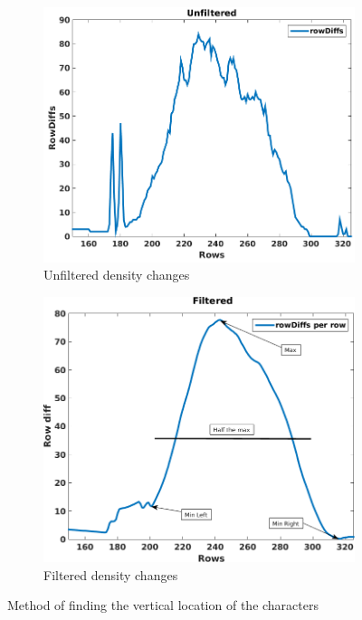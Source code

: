 \begin{figure}[ht]
  \centering
  \begin{subfigure}{0.49\textwidth}
    \centering
    \includegraphics[width=\textwidth]{./images/method/unfiltered.png}
    \caption{Unfiltered density changes}
    \label{fig:method:unfiltered}
  \end{subfigure}
  \begin{subfigure}{0.49\textwidth}
    \centering
    \includegraphics[width=\textwidth]{./images/method/filtered.png}
    \caption{Filtered density changes}
    \label{fig:method:filtered}
  \end{subfigure}
  \caption{Method of finding the vertical location of the characters}
  \label{fig:method:vertical:location}
\end{figure}

